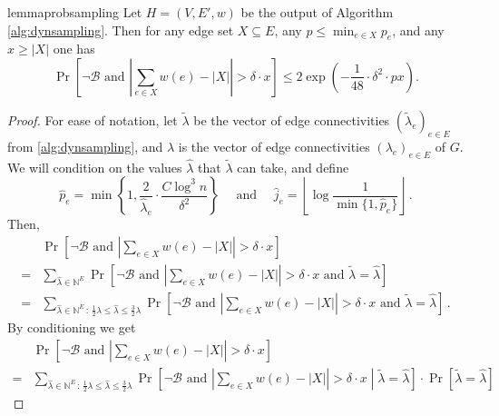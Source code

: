 \documentclass[epsfig,letter,11pt]{article}
\numberwithin{equation}{section}
\renewcommand{\hat}{\widehat}
\renewcommand{\tilde}{\widetilde}
\begin{document}
\begin{restatable}{lemma}{probsampling}
	\label{lem:probsampling}
	Let $H=(V,E',w)$ be the output of Algorithm \ref{alg:dynsampling}. Then for any edge set $X \subseteq E$, any $p \le \min_{e \in X} p_e$, and any $x \ge |X|$ one has
	\begin{equation*}
		\Pr\left[\neg \mathcal{B} \text{ and } \left|\sum_{e \in X} w(e) - |X|\right| > \delta \cdot x \right] \le 2 \exp\left(-\frac{1}{48} \cdot \delta^2 \cdot  p x\right).
	\end{equation*}
\end{restatable}
\begin{proof}
	For ease of notation, let $\tilde{\lambda}$ be the vector of edge connectivities $(\tilde{\lambda}_e)_{e \in E}$ from \cref{alg:dynsampling}, and $\lambda$ is the vector of edge connectivities $(\lambda_e)_{e\in E}$ of $G$. We will condition on the values $\hat{\lambda}$ that $\tilde{\lambda}$ can take, and define
	\begin{equation*}
		\hat{p}_e = \min \left\{1, \frac{2}{\hat{\lambda}_e}\cdot\frac{C \log^3 n}{\delta^2} \right\} \quad \text{ and } \quad  \hat{j}_e = \left\lfloor \log \frac{1}{\min\{1, \hat{p}_e\}}\right\rfloor  \, .
	\end{equation*}
	Then,
	\begin{align*}
		& \Pr\left[\neg \mathcal{B} \text{ and } \left|\sum_{e \in X} w(e) - |X|\right| > \delta \cdot x \right] \\
		= & \sum_{\hat{\lambda} \in \mathbb{N}^E} 	\Pr\left[\neg \mathcal{B} \text{ and } \left|\sum_{e \in X} w(e) - |X|\right| > \delta \cdot x  \text{ and } \tilde{\lambda}=\hat{\lambda} \right] \\
		= & \sum_{\hat{\lambda} \in \mathbb{N}^E \,:\, \frac{1}{2} \lambda \le {\hat{\lambda}} \le \frac{3}{2} \lambda	} \Pr\left[\neg \mathcal{B} \text{ and } \left|\sum_{e \in X} w(e) - |X|\right| > \delta \cdot x  \text{ and } \tilde{\lambda}=\hat{\lambda} \right] \, .
	\end{align*}
	By conditioning we get
	\begin{align*}
		& \Pr\left[\neg \mathcal{B} \text{ and } \left|\sum_{e \in X} w(e) - |X|\right| > \delta \cdot x \right] \\
		= & \sum_{\hat{\lambda} \in \mathbb{N}^E \,:\, \frac{1}{2} \lambda \le {\hat{\lambda}} \le \frac{3}{2} \lambda	} \Pr\left[\neg \mathcal{B}\text{ and } \left|\sum_{e \in X} w(e) - |X|\right| > \delta \cdot x  \middle| \tilde{\lambda}=\hat{\lambda} \right] \cdot \Pr\left[\tilde{\lambda}=\hat{\lambda}\right]

\end{align*}
\end{proof}
\end{document}
